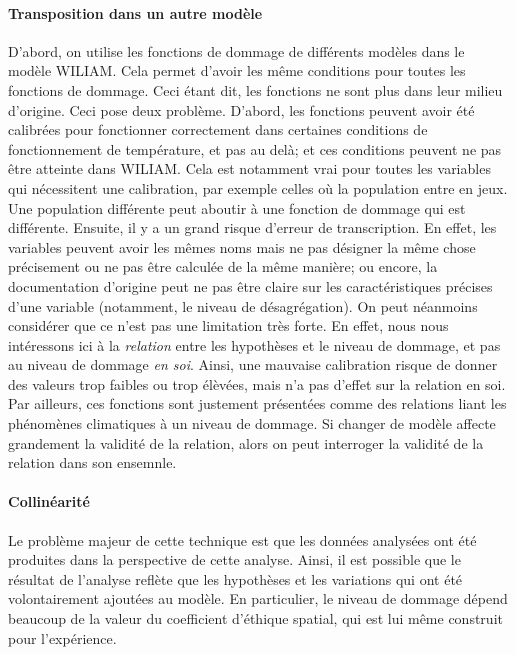 \paragraph{Transposition dans un autre modèle} D'abord, on utilise les fonctions de dommage de différents modèles dans le modèle WILIAM. Cela permet d'avoir les même conditions pour toutes les fonctions de dommage. Ceci étant dit, les fonctions ne sont plus dans leur milieu d'origine. Ceci pose deux problème. D'abord, les fonctions peuvent avoir été calibrées pour fonctionner correctement dans certaines conditions de fonctionnement de température, et pas au delà; et ces conditions peuvent ne pas être atteinte dans WILIAM. Cela est notamment vrai pour toutes les variables qui nécessitent une calibration, par exemple celles où la population entre en jeux. Une population différente peut aboutir à une fonction de dommage qui est différente. Ensuite, il y a un grand risque d'erreur de transcription. En effet, les variables peuvent avoir les mêmes noms mais ne pas désigner la même chose précisement ou ne pas être calculée de la même manière; ou encore, la documentation d'origine peut ne pas être claire sur les caractéristiques précises d'une variable (notamment, le niveau de désagrégation). On peut néanmoins considérer que ce n'est pas une limitation très forte. En effet, nous nous intéressons ici à la \emph{relation} entre les hypothèses et le niveau de dommage, et pas au niveau de dommage \emph{en soi}. Ainsi, une mauvaise calibration risque de donner des valeurs trop faibles ou trop élèvées, mais n'a pas d'effet sur la relation en soi. Par ailleurs, ces fonctions sont justement présentées comme des relations liant les phénomènes climatiques à un niveau de dommage. Si changer de modèle affecte grandement la validité de la relation, alors on peut interroger la validité de la relation dans son ensemnle. 

\paragraph{Collinéarité} Le problème majeur de cette technique est que les données analysées ont été produites dans la perspective de cette analyse. Ainsi, il est possible que le résultat de l'analyse  reflète que les hypothèses et les variations qui ont été volontairement ajoutées au modèle. En particulier, le niveau de dommage dépend beaucoup de la valeur du coefficient d'éthique spatial, qui est lui même construit pour l'expérience. 



